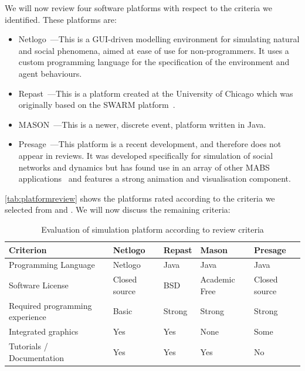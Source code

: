 We will now review four software platforms with respect to the criteria we identified. These platforms are:
\begin{itemize}
\item Netlogo~\citep{Wilensky1999a}---This is a \ac{GUI}-driven modelling environment for simulating natural and social phenomena, aimed at ease of use for non-programmers. It uses a custom programming language for the specification of the environment and agent behaviours.
\item Repast~\citep{Collier2009}---This is a platform created at the University of Chicago which was originally based on the SWARM platform~\citep{Minar1996}.
\item MASON~\citep{Luke2005}---This is a newer, discrete event, platform written in Java.
\item Presage~\citep{Neville:2009}---This platform is a recent development, and therefore does not appear in reviews. It was developed specifically for simulation of social networks and dynamics but has found use in an array of other \ac{MABS} applications~\citep{Pitt2011,Carr2012} and features a strong animation and visualisation component.
\end{itemize}


\autoref{tab:platformreview} shows the platforms rated according to the criteria we selected from \citet{CynthiaNikolaiandGregoryMadey2009} and \citet{Castle2006}. We will now discuss the remaining criteria:

\begin{table}
	\myfloatalign
	\begin{tabularx}{\textwidth}{X|p{}p{}p{}p{}}
	Criterion & Netlogo & Repast & Mason & Presage \\ \midrule
	Programming Language & Netlogo & Java & Java & Java \\
	Software License & Closed source & BSD & Academic Free & Closed source \\
	Required programming experience & Basic & Strong & Strong & Strong \\
	Integrated graphics & Yes & Yes & None & Some \\
	Tutorials / Documentation & Yes & Yes & Yes & No \\
	\end{tabularx}
	\caption{Evaluation of simulation platform according to review criteria}\label{tab:platformreview}
\end{table}

